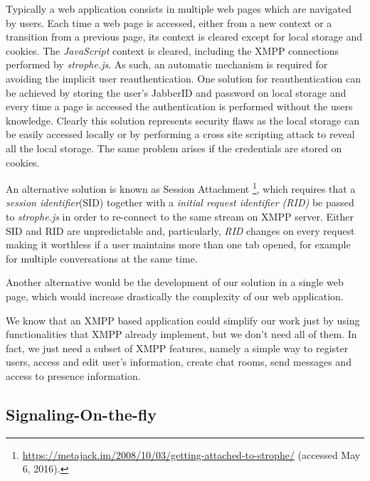     Typically a web application consists in multiple web pages which are navigated by users. Each time a web page is accessed, either from a new context or a transition from a previous page, its context is cleared except for local storage and cookies. The \emph{JavaScript} context is cleared, including the \ac{XMPP} connections performed by \emph{strophe.js}. As such, an automatic mechanism is required for avoiding the implicit user reauthentication.
    One solution for reauthentication can be achieved by storing the user's JabberID and password on local storage and every time a page is accessed the authentication is performed without the users knowledge. Clearly this solution represents security flaws as the local storage can be easily accessed locally or by performing a cross site scripting attack to reveal all the local storage. The same problem arises if the credentials are stored on cookies.

    An alternative solution is known as Session Attachment \footnote{\url{https://metajack.im/2008/10/03/getting-attached-to-strophe/} (accessed May 6, 2016).}, which requires that a \textit{session identifier}(SID) together with a \textit{initial request identifier (RID)} be passed to \emph{strophe.js} in order to re-connect to the same stream on \ac{XMPP} server. Either SID and RID are unpredictable and, particularly, \textit{RID} changes on every request making it worthless if a user maintains more than one tab opened, for example for multiple conversations at the same time.
    
    Another alternative would be the development of our solution in a single web page, which would increase drastically the complexity of our web application.

    We know that an \ac{XMPP} based application could simplify our work just by using functionalities that \ac{XMPP} already implement, but  we don't need all of them. In fact, we just need a subset of \ac{XMPP} features, namely a simple way to register users, access and edit user's information, create chat rooms, send messages and access to presence information.


  \subsection{Signaling-On-the-fly}


